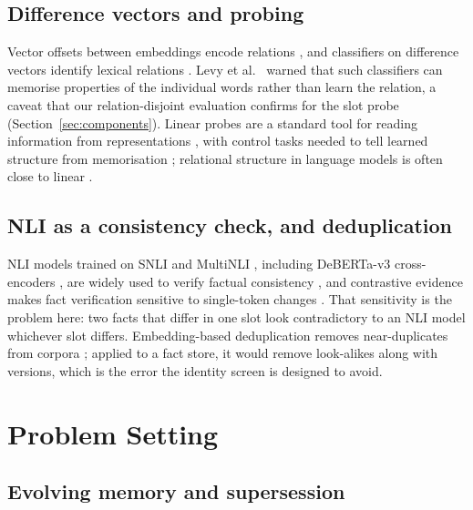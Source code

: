 \documentclass[journal=jcisd8,manuscript=article]{achemso}
\begin{document}
\subsection{Difference vectors and probing}

Vector offsets between embeddings encode relations \cite{mikolov2013regularities}, and classifiers on difference vectors identify lexical relations \cite{vylomova2016differences}. Levy et al.~\cite{levy2015supervised} warned that such classifiers can memorise properties of the individual words rather than learn the relation, a caveat that our relation-disjoint evaluation confirms for the slot probe (Section~\ref{sec:components}). Linear probes are a standard tool for reading information from representations \cite{alain2017probes,belinkov2022probing}, with control tasks needed to tell learned structure from memorisation \cite{hewitt2019control}; relational structure in language models is often close to linear \cite{hernandez2024linearity}.

\subsection{NLI as a consistency check, and deduplication}

NLI models trained on SNLI and MultiNLI \cite{bowman2015snli,williams2018mnli}, including DeBERTa-v3 cross-encoders \cite{he2023debertav3}, are widely used to verify factual consistency \cite{honovich2022true,laban2022summac}, and contrastive evidence makes fact verification sensitive to single-token changes \cite{schuster2021vitaminc}. That sensitivity is the problem here: two facts that differ in one slot look contradictory to an NLI model whichever slot differs. Embedding-based deduplication removes near-duplicates from corpora \cite{abbas2023semdedup,lee2022dedup}; applied to a fact store, it would remove look-alikes along with versions, which is the error the identity screen is designed to avoid.

\section{Problem Setting}
\label{sec:problem}

\subsection{Evolving memory and supersession}
\label{sec:setting}
\end{document}
